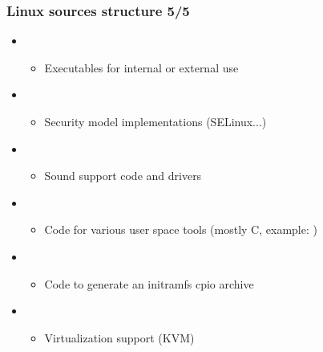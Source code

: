 \begin{frame}
  \frametitle{Linux sources structure 5/5}
  \begin{itemize}
  \item {}
    \begin{itemize}
    \item Executables for internal or external use
    \end{itemize}
  \item {}
    \begin{itemize}
    \item Security model implementations (SELinux...)
    \end{itemize}
  \item {}
    \begin{itemize}
    \item Sound support code and drivers
    \end{itemize}
  \item {}
    \begin{itemize}
    \item Code for various user space tools (mostly C, example:
          )
    \end{itemize}
  \item {}
    \begin{itemize}
    \item Code to generate an initramfs cpio archive
    \end{itemize}
  \item {}
    \begin{itemize}
    \item Virtualization support (KVM)
    \end{itemize}
  \end{itemize}
\end{frame}
